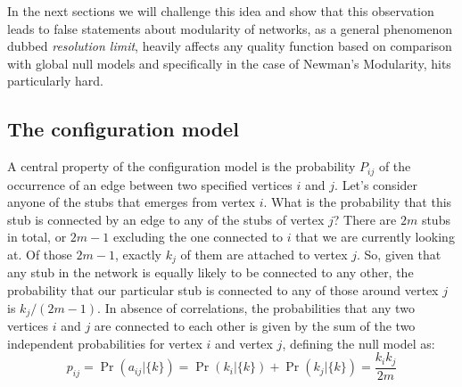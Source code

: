 In the next sections we will challenge this idea and show that this observation leads to false statements about modularity of networks, as a general phenomenon dubbed \emph{resolution limit}, heavily affects any quality function based on comparison with global null models and specifically in the case of Newman's Modularity, hits particularly hard.

\subsection{The configuration model}\label{sec:configuration_model}
A central property of the configuration model is the probability $P_{ij}$ of the occurrence of an edge between two specified vertices $i$ and $j$.
Let's consider anyone of the stubs that emerges from vertex $i$.
What is the probability that this stub is connected by an edge to any of the stubs of vertex $j$?
There are $2m$ stubs in total, or $2m - 1$ excluding the one connected to $i$ that we are currently looking at.
Of those $2m - 1$, exactly $k_j$ of them are attached to vertex $j$.
So, given that any stub in the network is equally likely to be connected to any other, the probability that our particular stub is connected to any of those around vertex $j$ is $k_j/(2m-1)$.
In absence of correlations, the probabilities that any two vertices $i$ and $j$ are connected to each other is given by the sum of the two independent probabilities for vertex $i$ and vertex $j$, defining the null model as:
\begin{equation}\label{eq:configuration_model_probability}
p_{ij} = \Pr \left ( a_{ij} | \{ k \} \right) = \Pr(k_i | \{ k \}) + \Pr(k_j | \{ k \})=\frac{k_i k_j}{2m}
\end{equation}

